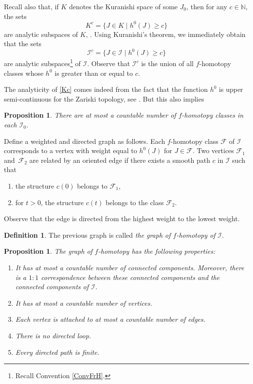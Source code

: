 \documentclass[10pt]{amsart}
\let\mathcal\mathscr
\theoremstyle{plain}
\newtheorem{proposition}[theorem]{Proposition}
\theoremstyle{definition}
\newtheorem{definition}[theorem]{Definition}
\theoremstyle{remark}
\numberwithin{equation}{section}
\newcommand{\cI}{\mathcal{I}}
\begin{document}
Recall also that, if $K$ denotes the Kuranishi space of some $J_0$, then for any $c\in\mathbb N$, the sets
\begin{equation}
\label{Kc}
K^c=\{J\in K\mid h^0(J)\geq c\}
\end{equation}
are analytic subspaces of $K$, \cf \cite{Gr}. Using Kuranishi's theorem, we immediately obtain that the sets
\begin{equation}
\label{Ic}
\cI^c=\{J\in \cI\mid h^0(J)\geq c\}
\end{equation}
are analytic subspaces\footnote{Recall Convention \ref{ConvFrH}.} of $\cI$. Observe that $\cI^c$ is the union of all $f$-homotopy classes whose $h^0$ is greater than or equal to $c$.

The analyticity of \eqref{Kc} comes indeed from the fact that the function $h^0$ is upper semi-continuous for the Zariski topology, see \cite{Gr}. But this also implies
\begin{proposition}
\label{countable2}
There are at most a countable number of $f$-homotopy classes in each $\cI_0$.
\end{proposition}

Define a weighted and directed graph as follows. Each $f$-homotopy class $\mathcal F$ of $\cI$ corresponds to a vertex with weight equal to $h^0(J)$ for $J\in\mathcal F$. Two vertices $\mathcal F_1$ and~$\mathcal F_2$ are related by an oriented edge if there exists a smooth path $c$ in $\cI$ such that
\begin{enumerate}
\item
the structure $c(0)$ belongs to $\mathcal F_1$,
\item
for $t>0$, the structure $c(t)$ belongs to the class $\mathcal F_2$.
\end{enumerate}
Observe that the edge is directed from the highest weight to the lowest weight.

\begin{definition}
\label{graph}
The previous graph is called \emph{the graph of $f$-homotopy of $\cI$}.
\end{definition}

\begin{proposition}
\label{graphproperties}
The graph of $f$-homotopy has the following properties:
\begin{enumerate}
\item\label{graphproperties1}
It has at most a countable number of connected components. Moreover, there is a $1:1$ correspondence between these connected components and the connected components of $\cI$.
\item\label{graphproperties2}
It has at most a countable number of vertices.
\item\label{graphproperties3}
Each vertex is attached to at most a countable number of edges.
\item\label{graphproperties4}
There is no directed loop.
\item\label{graphproperties5}
Every directed path is finite.
\end{enumerate}
\end{proposition}
\end{document}
